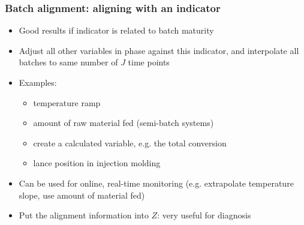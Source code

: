 \begin{frame}\frametitle{Batch alignment: aligning with an indicator}

\begin{itemize}
	
	\item	Good results if indicator is related to batch maturity
	
	\item	Adjust all other variables in phase against this indicator, and interpolate all batches to same number of \( J \) time points
	
	\item	Examples: 
			
			\begin{itemize}
				\item	temperature ramp
				
				\item	amount of raw material fed (semi-batch systems)
				
				\item	create a calculated variable, e.g. the total conversion
				
				\item	lance position in injection molding
			\end{itemize}
			
			\pause
	
	\item	Can be used for online, real-time monitoring (e.g. extrapolate temperature slope, use amount of material fed) \pause
	
	\item	Put the alignment information into \( Z \): very useful for diagnosis
\end{itemize}


\end{frame}

